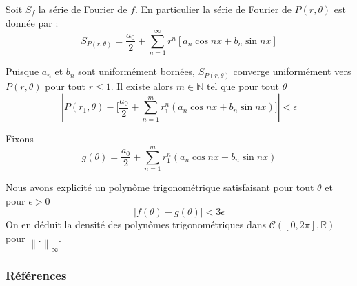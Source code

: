 \documentclass[
	10pt, %
]{beamer}
\begin{document}
\begin{frame}
	Soit \( S_f \) la série de Fourier de \( f \). En particulier la série de Fourier de \( P(r,\theta) \) est donnée par :
	\[
		S_{P(r,\theta)} = \frac{a_0}{2} + 
		\sum_{n=1}^{\infty} r^{n} \left[ a_n \cos nx + b_n \sin nx \right]
	\]

	Puisque \( a_n \) et \( b_n \) sont uniformément bornées, \( S_{P(r,\theta)} \) converge uniformément vers \( P(r,\theta) \) pour tout \( r \le 1 \). Il existe alors \( m \in \mathbb{N} \) tel que pour tout \( \theta \) 
	\begin{equation*}
		{\left\lvert P(r_1,\theta) - 
		\lbrack \frac{a_0}{2} + \sum_{n=1}^{m} r_1^{n}(a_n \cos nx + b_n \sin nx) \rbrack \right\rvert} < \epsilon
	\end{equation*}

	Fixons
	\begin{equation*}
		g(\theta) = \frac{a_0}{2} + \sum_{n=1}^{m} r_1^{n}(a_n \cos nx + b_n \sin nx) 
	\end{equation*}

	Nous avons explicité un polynôme trigonométrique satisfaisant pour tout \( \theta \) et pour \( \epsilon > 0 \)
	\begin{equation*}
		{\left\lvert f(\theta) - g(\theta) \right\rvert} < 3\epsilon
	\end{equation*}
	On en déduit la densité des polynômes trigonométriques dans \( \mathcal{C}([0,2\pi],\mathbb{R}) \) pour \( {\left\lVert . \right\rVert}_{\infty} \).
\end{frame}

\begin{frame} %
	\frametitle{Références}
	
	{\footnotesize
	\printbibliography}

\end{frame}


		
		

\end{document}
